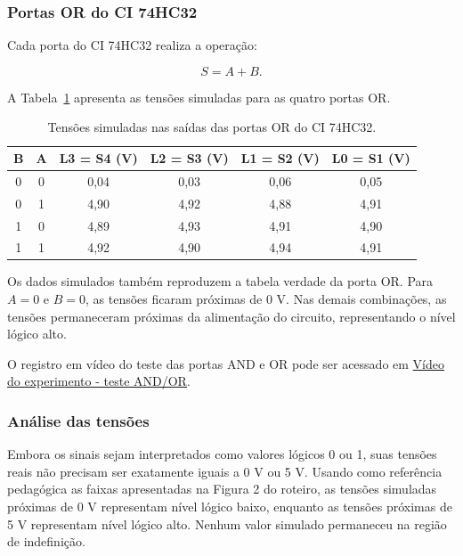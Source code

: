\documentclass[12pt]{article}
\begin{document}
\subsubsection{Portas OR do CI 74HC32}

Cada porta do CI 74HC32 realiza a operação:

\begin{equation}
    S=A+B.
\end{equation}

A Tabela~\ref{tab:or} apresenta as tensões simuladas para as quatro portas OR.

\begin{table}[H]
    \centering
    \caption{Tensões simuladas nas saídas das portas OR do CI 74HC32.}
    \label{tab:or}
    \begin{tabular}{|c|c|c|c|c|c|}
        \hline
        B & A & L3 = S4 (V) & L2 = S3 (V) & L1 = S2 (V) & L0 = S1 (V) \\
        \hline
        0 & 0 & 0,04 & 0,03 & 0,06 & 0,05 \\
        \hline
        0 & 1 & 4,90 & 4,92 & 4,88 & 4,91 \\
        \hline
        1 & 0 & 4,89 & 4,93 & 4,91 & 4,90 \\
        \hline
        1 & 1 & 4,92 & 4,90 & 4,94 & 4,91 \\
        \hline
    \end{tabular}
\end{table}

Os dados simulados também reproduzem a tabela verdade da porta OR. Para
$A=0$ e $B=0$, as tensões ficaram próximas de 0 V. Nas demais combinações,
as tensões permaneceram próximas da alimentação do circuito, representando o
nível lógico alto.

O registro em vídeo do teste das portas AND e OR pode ser acessado em
\href{https://drive.google.com/file/d/1eVGJeG3TJrlJT-N0to8uFadk5Nuf4HiG/view?usp=drivesdk}{Vídeo do experimento - teste AND/OR}.

\subsubsection{Análise das tensões}

Embora os sinais sejam interpretados como valores lógicos 0 ou 1, suas tensões
reais não precisam ser exatamente iguais a 0 V ou 5 V. Usando como referência
pedagógica as faixas apresentadas na Figura 2 do roteiro, as tensões simuladas
próximas de 0 V representam nível lógico baixo, enquanto as tensões próximas de
5 V representam nível lógico alto. Nenhum valor simulado permaneceu na região
de indefinição.
\end{document}
